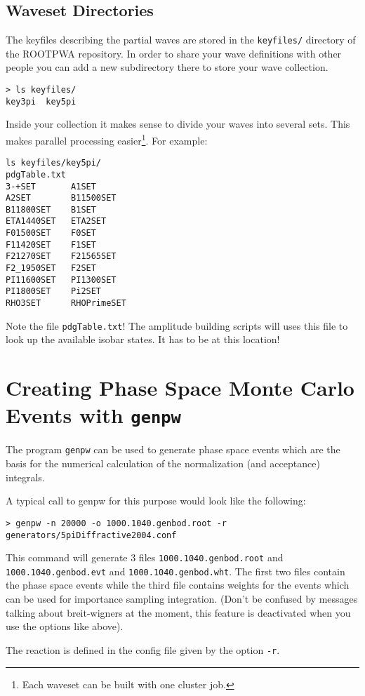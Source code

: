 \documentclass[12pt,a4paper]{article}
\begin{document}
{\subsection{Waveset Directories}
The keyfiles describing the partial waves are stored in the {\tt keyfiles/} directory of the ROOTPWA repository. In order to share your wave definitions with other people you can add a new subdirectory there to store your wave collection.
\begin{verbatim}
> ls keyfiles/
key3pi  key5pi
\end{verbatim}
Inside your collection it makes sense to divide your waves into several sets. This makes parallel processing easier\footnote{Each waveset can be built with one cluster job.}. For example:
\begin{verbatim}
ls keyfiles/key5pi/
pdgTable.txt
3-+SET       A1SET
A2SET        B11500SET
B11800SET    B1SET
ETA1440SET   ETA2SET
F01500SET    F0SET
F11420SET    F1SET
F21270SET    F21565SET
F2_1950SET   F2SET
PI11600SET   PI1300SET
PI1800SET    Pi2SET
RHO3SET      RHOPrimeSET
\end{verbatim}
Note the file {\tt pdgTable.txt}! The amplitude building scripts will uses this file to look up the available isobar states. It has to be at this location!

\section{Creating Phase Space Monte Carlo Events with {\tt genpw}}
The program {\tt genpw} can be used to generate phase space events which are the basis for the numerical calculation of the normalization (and acceptance) integrals.

A typical call to genpw for this purpose would look like the following:

\begin{verbatim}
> genpw -n 20000 -o 1000.1040.genbod.root -r generators/5piDiffractive2004.conf
\end{verbatim}

This command will generate 3 files {\tt 1000.1040.genbod.root} and  {\tt 1000.1040.genbod.evt} and {\tt 1000.1040.genbod.wht}. The first two files contain the phase space events while the third file contains weights for the events which can be used for importance sampling integration. (Don't be confused by messages talking about breit-wigners at the moment, this feature is deactivated when you use the options like above).

The reaction is defined in the config file given by the option {\tt -r}.

}
\end{document}
